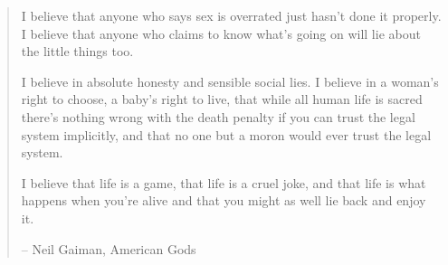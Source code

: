\begin{quote}
    I believe that anyone who says sex is overrated just hasn't done it properly. I believe that anyone who claims to know what's going on will lie about the little things too. 

    I believe in absolute honesty and sensible social lies. I believe in a woman's right to choose, a baby's right to live, that while all human life is sacred there's nothing wrong with the death penalty if you can trust the legal system implicitly, and that no one but a moron would ever trust the legal system. 

    I believe that life is a game, that life is a cruel joke, and that life is what happens when you're alive and that you might as well lie back and enjoy it.

    \begin{flushright}
    -- Neil Gaiman, American Gods
    \end{flushright}
\end{quote}

